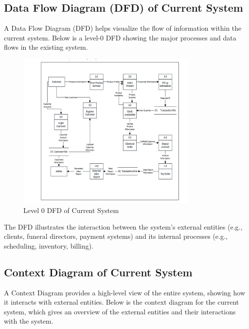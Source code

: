 \documentclass[a4paper,12pt]{report}
\begin{document}
\subsection{Data Flow Diagram (DFD) of Current System}
A Data Flow Diagram (DFD) helps visualize the flow of information within the current system. Below is a level-0 DFD showing the major processes and data flows in the existing system.

\begin{figure}[ht]
\centering
\includegraphics[width=0.8\textwidth]{../img/activity.png}
\caption{Level 0 DFD of Current System}
\label{fig:dfd_level_0}
\end{figure}

The DFD illustrates the interaction between the system’s external entities (e.g., clients, funeral directors, payment systems) and its internal processes (e.g., scheduling, inventory, billing).

\subsection{Context Diagram of Current System}
A Context Diagram provides a high-level view of the entire system, showing how it interacts with external entities. Below is the context diagram for the current system, which gives an overview of the external entities and their interactions with the system.

\end{document}
